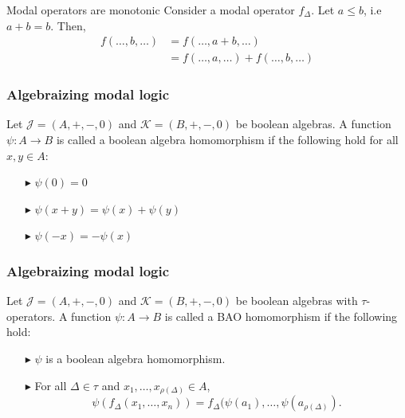 \documentclass[10pt]{beamer}
\theoremstyle{definition}
\theoremstyle{definition}
\begin{document}
\begin{frame}\label{frame: modal operators are monotonic}

\begin{block}{Modal operators are monotonic}
Consider a modal operator $f_{\Delta}$. Let $a \leq b$, i.e $a + b = b$.
\pause Then,
\begin{align*}
f(\dots,b,\dots) &= f(\dots,a+b,\dots) \\
                 &= f(\dots,a,\dots) + f(\dots,b,\dots)
\end{align*}

\end{block}

\end{frame}

\begin{frame}\label{frame: boolean alg hom}

\frametitle{Algebraizing modal logic}

\begin{definition}
Let $\mathcal{J} = (A,+,-,0)$ and $\mathcal{K} = (B,+,-,0)$ be boolean algebras. 
A function $\psi : A \to B$ is called a boolean algebra homomorphism if the following hold
for all $x,y\in A$:
\begin{enumerate}
\item[$\blacktriangleright$] $\psi(0) = 0$
\item[$\blacktriangleright$] $\psi(x + y) = \psi(x) + \psi(y)$
\item[$\blacktriangleright$] $\psi(-x) = -\psi (x)$
\end{enumerate} 
\end{definition}
\end{frame}

\begin{frame}\label{frame: bao hom}
\frametitle{Algebraizing modal logic}

\begin{definition}
Let $\mathcal{J} = (A,+,-,0)$ and $\mathcal{K} = (B,+,-,0)$ be boolean algebras with
$\tau$-operators. A function $\psi : A \to B$ is called a BAO homomorphism 
if the following hold:
\begin{enumerate}
\item[$\blacktriangleright$] $\psi$ is a boolean algebra homomorphism.
\item[$\blacktriangleright$] For all $\Delta \in \tau$ and 
$x_1,\dots,x_{\rho(\Delta)} \in A$,
$$\psi(f_{\Delta}(x_1,\dots,x_n)) = 
f_{\Delta}(\psi(a_1),\dots,\psi(a_{\rho(\Delta)}).$$
\end{enumerate} 
\end{definition}
\end{frame}
\end{document}
